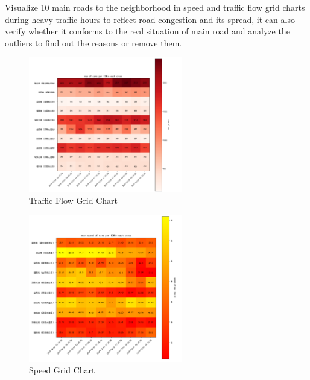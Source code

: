 \documentclass[fontset=none]{ctexart}
\theoremstyle{definition}
\theoremstyle{remark}
\begin{document}
\clearpage
Visualize 10 main roads to the neighborhood in speed and traffic flow grid charts during heavy traffic hours to reflect road congestion and its spread, it can also verify whether it conforms to the real situation of main road and analyze the outliers to find out the reasons or remove them.
\begin{figure}[h!]
  \centering
  \includegraphics[width=0.6\textwidth]{images/7-3-5.png}
  \caption{Traffic Flow Grid Chart}
  \label{fig: 735}
\end{figure}
\begin{figure}[h!]
  \centering
  \includegraphics[height=\dimexpr\pagegoal-\pagetotal-4\baselineskip\relax,
                  width=0.6\textwidth,
                  keepaspectratio]
                  {images/7-3-6.png}
  \caption{Speed Grid Chart}
  \label{fig: 736}
\end{figure}
\end{document}
